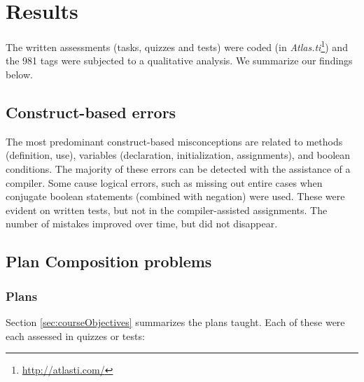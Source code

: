 \section{Results}\label{sec:results}

The written assessments (tasks, quizzes and tests) were coded (in
\emph{Atlas.ti}\footnote{\url{http://atlasti.com/}}) and the 981 tags were
subjected to a qualitative analysis. We summarize our findings below.%


\subsection*{Construct-based errors}

The most predominant construct-based misconceptions are related to methods
(definition, use), variables (declaration, initialization, assignments), and
boolean conditions. The majority of these errors can be detected with the
assistance of a compiler. Some cause logical errors, such as missing out
entire cases when conjugate boolean statements (combined with negation) were
used. These were evident on written tests, but not in the compiler-assisted
assignments. The number of mistakes improved over time, but did not
disappear.


\subsection*{Plan Composition problems}


\subsubsection*{Plans}

Section \ref{sec:courseObjectives} summarizes the plans taught. Each of these
were each assessed in quizzes or tests:

